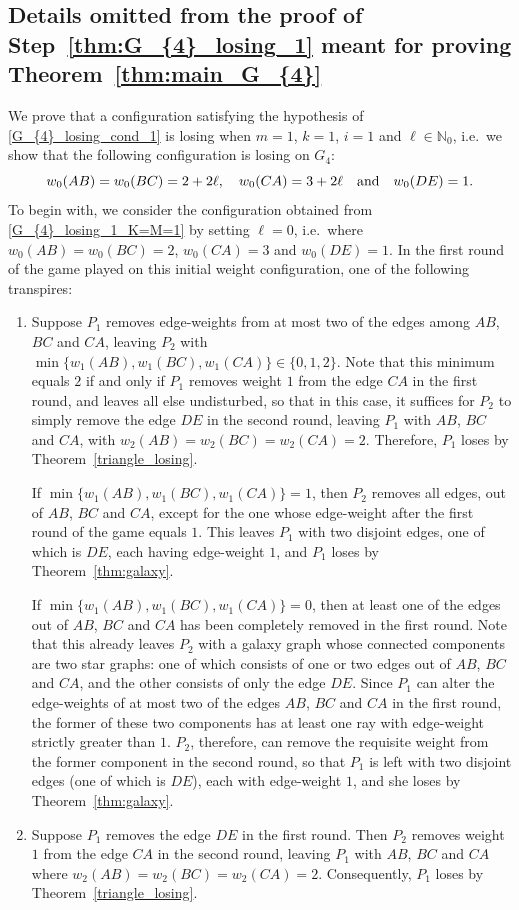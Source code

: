 \documentclass[11pt,reqno]{amsart}
\theoremstyle{definition}
\theoremstyle{definition}
\begin{document}
\subsection{Details omitted from the proof of Step~\eqref{thm:G_{4}_losing_1} meant for proving Theorem~\ref{thm:main_G_{4}}}\label{subsec:appendix_G_{4}_losing_1}
We prove that a configuration satisfying the hypothesis of \eqref{G_{4}_losing_cond_1} is losing when $m=1$, $k=1$, $i=1$ and $\ell \in \mathbb{N}_{0}$, i.e.\ we show that the following configuration is losing on $G_{4}$:
\begin{equation}
w_{0}(AB)=w_{0}(BC)=2+2\ell, \quad w_{0}(CA)=3+2\ell \quad \text{and} \quad w_{0}(DE)=1.\label{G_{4}_losing_1_K=M=1}
\end{equation}
To begin with, we consider the configuration obtained from \eqref{G_{4}_losing_1_K=M=1} by setting $\ell=0$, i.e.\ where $w_{0}(AB)=w_{0}(BC)=2$, $w_{0}(CA)=3$ and $w_{0}(DE)=1$. In the first round of the game played on this initial weight configuration, one of the following transpires:
\begin{enumerate}
\item Suppose $P_{1}$ removes edge-weights from at most two of the edges among $AB$, $BC$ and $CA$, leaving $P_{2}$ with $\min\{w_{1}(AB),w_{1}(BC),w_{1}(CA)\} \in \{0,1,2\}$. Note that this minimum equals $2$ if and only if $P_{1}$ removes weight $1$ from the edge $CA$ in the first round, and leaves all else undisturbed, so that in this case, it suffices for $P_{2}$ to simply remove the edge $DE$ in the second round, leaving $P_{1}$ with $AB$, $BC$ and $CA$, with $w_{2}(AB)=w_{2}(BC)=w_{2}(CA)=2$. Therefore, $P_{1}$ loses by Theorem~\ref{triangle_losing}.

If $\min\{w_{1}(AB),w_{1}(BC),w_{1}(CA)\}=1$, then $P_{2}$ removes all edges, out of $AB$, $BC$ and $CA$, except for the one whose edge-weight after the first round of the game equals $1$. This leaves $P_{1}$ with two disjoint edges, one of which is $DE$, each having edge-weight $1$, and $P_{1}$ loses by Theorem~\ref{thm:galaxy}.

If $\min\{w_{1}(AB),w_{1}(BC),w_{1}(CA)\}=0$, then at least one of the edges out of $AB$, $BC$ and $CA$ has been completely removed in the first round. Note that this already leaves $P_{2}$ with a galaxy graph whose connected components are two star graphs: one of which consists of one or two edges out of $AB$, $BC$ and $CA$, and the other consists of only the edge $DE$. Since $P_{1}$ can alter the edge-weights of at most two of the edges $AB$, $BC$ and $CA$ in the first round, the former of these two components has at least one ray with edge-weight strictly greater than $1$. $P_{2}$, therefore, can remove the requisite weight from the former component in the second round, so that $P_{1}$ is left with two disjoint edges (one of which is $DE$), each with edge-weight $1$, and she loses by Theorem~\ref{thm:galaxy}.

\item Suppose $P_{1}$ removes the edge $DE$ in the first round. Then $P_{2}$ removes weight $1$ from the edge $CA$ in the second round, leaving $P_{1}$ with $AB$, $BC$ and $CA$ where $w_{2}(AB)=w_{2}(BC)=w_{2}(CA)=2$. Consequently, $P_{1}$ loses by Theorem~\ref{triangle_losing}.
\end{enumerate}
\end{document}
